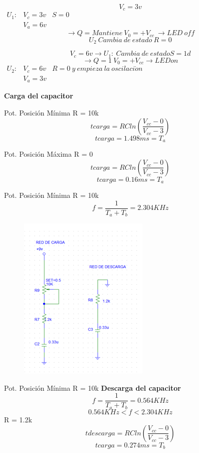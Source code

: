 \documentclass[a4paper,11pt]{article}
\begin{document}
$$V_c = 3v$$
$\begin{array}{lcl}
U_1: & V_c = 3v & S=0 \\
	& V_a = 6v &
\end{array}$
$$\rightarrow Q = Mantiene \ V_0= +V_{cc} \ \rightarrow LED \ off$$
$$U_2 \ Cambia \ de \ estado \ R=0$$

$$V_c = 6v \rightarrow U_1: \ Cambia \ de \ estado S = 1d$$
$$\rightarrow Q=1 \ V_0= +V_{cc} \rightarrow LED on$$
$\begin{array}{lcl}
U_2: & V_c = 6v & R = 0 \ y \ empieza \ la \ oscilaci\acute{o}n \\
	& V_a = 3v & 
\end{array}$

\textbf{Carga del capacitor}

Pot. Posición Mínima R = 10k
$$tcarga = RC ln(\frac{V_{cc}-0}{V_{cc}-3})$$
$$tcarga = 1.498ms = T_a$$

Pot. Posición Máxima R = 0
$$tcarga = RC ln(\frac{V_{cc}-0}{V_{cc}-3})$$
$$tcarga = 0.16 ms = T_a$$

Pot. Posición Mínima R = 10k
$$f = \frac{1}{T_a + T_b} = 2.304KHz$$

\begin{figure}[h]
	\centering
	\includegraphics[width=0.7\linewidth]{./21a}
\end{figure}

Pot. Posición Mínima R = 10k
\textbf{Descarga del capacitor}
$$f= \frac{1}{T_a + T_b} = 0.564 KHz$$
$$0.564KHz<f<2.304 KHz$$
R = 1.2k
$$tdescarga = RCln(\frac{V_{cc} - 0}{V_{cc} - 3})$$
$$tcarga = 0.274 ms = T_b$$
\end{document}
